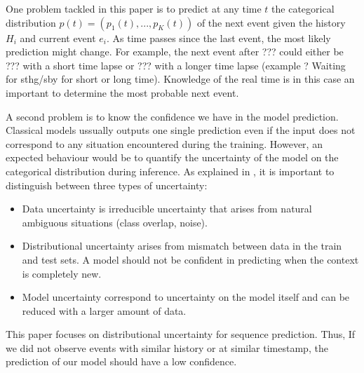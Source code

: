 One problem tackled in this paper is to predict at any time $t$ the categorical distribution $p(t)=(p_1(t),..., p_K(t))$ of the next event given the history $H_i$ and current event $e_i$. As time passes since the last event, the most likely prediction might change. For example, the next event after ??? could either be ??? with a short time lapse or ??? with a longer time lapse (example ? Waiting for sthg/sby for short or long time). Knowledge of the real time is in this case an important to determine the most probable next event.

A second problem is to know the confidence we have in the model prediction. Classical models ussually outputs one single prediction even if the input does not correspond to any situation encountered during the training. However, an expected behaviour would be to quantify the uncertainty of the model on the categorical distribution during inference. As explained in \cite{PriorNetworks}, it is important to distinguish between three types of uncertainty:
\begin{itemize}
\item Data uncertainty is irreducible uncertainty that arises from natural ambiguous situations (class overlap, noise).
\item Distributional uncertainty arises from mismatch between data in the train and test sets. A model should not be confident in predicting when the context is completely new.
\item Model uncertainty correspond to uncertainty on the model itself and can be reduced with a larger amount of data.
\end{itemize}
This paper focuses on distributional uncertainty for sequence prediction. Thus, If we did not observe events with similar history or at similar timestamp, the prediction of our model should have a low confidence.
